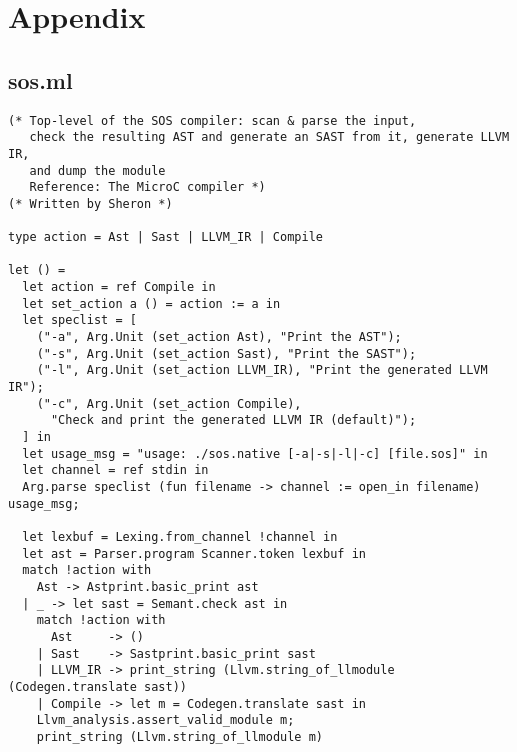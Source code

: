 \documentclass[main.tex]{subfiles}
\begin{document}
	\section{Appendix}
	

\subsection{sos.ml}

\begin{lstlisting}
(* Top-level of the SOS compiler: scan & parse the input,
   check the resulting AST and generate an SAST from it, generate LLVM IR,
   and dump the module 
   Reference: The MicroC compiler *)
(* Written by Sheron *)
 
type action = Ast | Sast | LLVM_IR | Compile

let () =
  let action = ref Compile in
  let set_action a () = action := a in
  let speclist = [
    ("-a", Arg.Unit (set_action Ast), "Print the AST");
    ("-s", Arg.Unit (set_action Sast), "Print the SAST");
    ("-l", Arg.Unit (set_action LLVM_IR), "Print the generated LLVM IR");
    ("-c", Arg.Unit (set_action Compile),
      "Check and print the generated LLVM IR (default)");
  ] in  
  let usage_msg = "usage: ./sos.native [-a|-s|-l|-c] [file.sos]" in
  let channel = ref stdin in
  Arg.parse speclist (fun filename -> channel := open_in filename) usage_msg;
  
  let lexbuf = Lexing.from_channel !channel in
  let ast = Parser.program Scanner.token lexbuf in  
  match !action with
    Ast -> Astprint.basic_print ast
  | _ -> let sast = Semant.check ast in
    match !action with
      Ast     -> ()
    | Sast    -> Sastprint.basic_print sast
    | LLVM_IR -> print_string (Llvm.string_of_llmodule (Codegen.translate sast))
    | Compile -> let m = Codegen.translate sast in
	Llvm_analysis.assert_valid_module m;
	print_string (Llvm.string_of_llmodule m)
\end{lstlisting}
\end{document}
